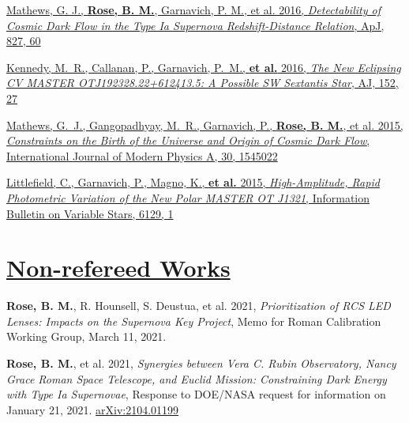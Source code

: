 \documentclass[margin]{res}
\begin{document}
\begin{resume}
\hangindent=15pt 
\href{https://ui.adsabs.harvard.edu/#abs/2016ApJ...827...60M/abstract}{Mathews, G. J., {\bf Rose, B. M.}, Garnavich, P. M., et al. 2016, {\sl Detectability of Cosmic Dark Flow in the Type Ia Supernova Redshift-Distance Relation}, ApJ, 827, 60}

\vspace{-12pt}
\hangindent=15pt 
\href{https://ui.adsabs.harvard.edu/#abs/2016AJ....152...27K/abstract}{Kennedy, M.~R., Callanan, P., Garnavich, P.~M., {\bf et al.} 2016, {\sl The New Eclipsing CV MASTER OTJ192328.22+612413.5: A Possible SW Sextantis Star}, AJ, 152, 27}

\vspace{-12pt}
\hangindent=15pt 
\href{https://ui.adsabs.harvard.edu/#abs/2015IJMPA..3045022M/abstract}{Mathews, G.~J., Gangopadhyay, M.~R., Garnavich, P., {\bf Rose, B. M.}, et al. 2015, {\sl Constraints on the Birth of the Universe and Origin of Cosmic Dark Flow}, International Journal of Modern Physics A, 30, 1545022}

\vspace{-12pt}
\hangindent=15pt 
\href{https://ui.adsabs.harvard.edu/#abs/2015IBVS.6129....1L/abstract}{Littlefield, C., Garnavich, P., Magno, K., {\bf et al.} 2015, {\sl High-Amplitude, Rapid Photometric Variation of the New Polar MASTER OT J1321}, Information Bulletin on Variable Stars, 6129, 1}



\section{\href{https://ui.adsabs.harvard.edu/\#search/q=orcid\%3A\%220000-0002-1873-8973\%22&sort=date\%20desc\%2C\%20bibcode\%20desc}{Non-refereed Works}}

\hangindent=15pt 
\textbf{Rose, B. M.},  R. Hounsell,  S. Deustua,  et al. 2021, {\sl Prioritization of RCS LED Lenses: Impacts on the Supernova Key Project}, Memo for Roman Calibration Working Group, March 11, 2021.
\vspace{-12pt}

\hangindent=15pt 
\textbf{Rose, B. M.}, et al. 2021, {\sl Synergies between Vera C. Rubin Observatory, Nancy Grace Roman Space Telescope, and Euclid Mission: Constraining Dark Energy with Type Ia Supernovae}, Response to DOE/NASA request for information on January 21, 2021. \href{https://arxiv.org/abs/2104.01199}{arXiv:2104.01199}
\vspace{-12pt}


\end{resume}
\end{document}
